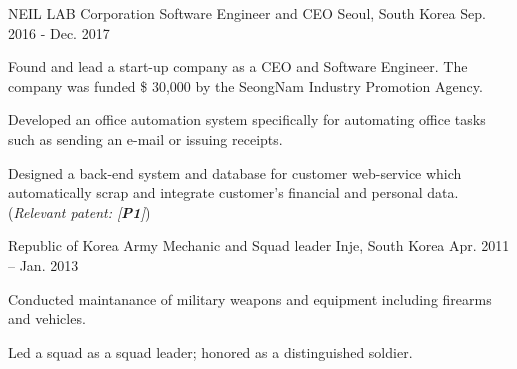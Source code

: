 


\begin{cventries}

\cventry
{NEIL LAB Corporation} %
{Software Engineer and CEO} %
{Seoul, South Korea} %
{Sep. 2016 - Dec. 2017} %
{ %
\begin{cvitems}
\item {Found and lead a start-up company as a CEO and Software Engineer. The company was funded \$ 30,000 by the SeongNam Industry Promotion Agency.}
\item {Developed an office automation system specifically for automating office tasks such as sending an e-mail or issuing receipts.}
\item {Designed a back-end system and database for customer web-service which automatically scrap and integrate customer's financial and personal data. (\textit{Relevant patent: [\textbf{P1}]})}
\end{cvitems}
}

\cventry
{Republic of Korea Army} %
{Mechanic and Squad leader} %
{Inje, South Korea} %
{Apr. 2011 – Jan. 2013} %
{ %
\begin{cvitems}
\item {Conducted maintanance of military weapons and equipment including firearms and vehicles.}
\item {Led a squad as a squad leader; honored as a distinguished soldier.}
\end{cvitems}
}


\end{cventries}
